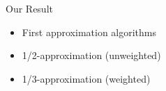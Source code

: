 \begin{frame}{Our Result}
\begin{itemize}[<+>]
  \item First approximation algorithms 
  \item 1/2-approximation (unweighted)
  \item 1/3-approximation (weighted)
\end{itemize}
\end{frame}